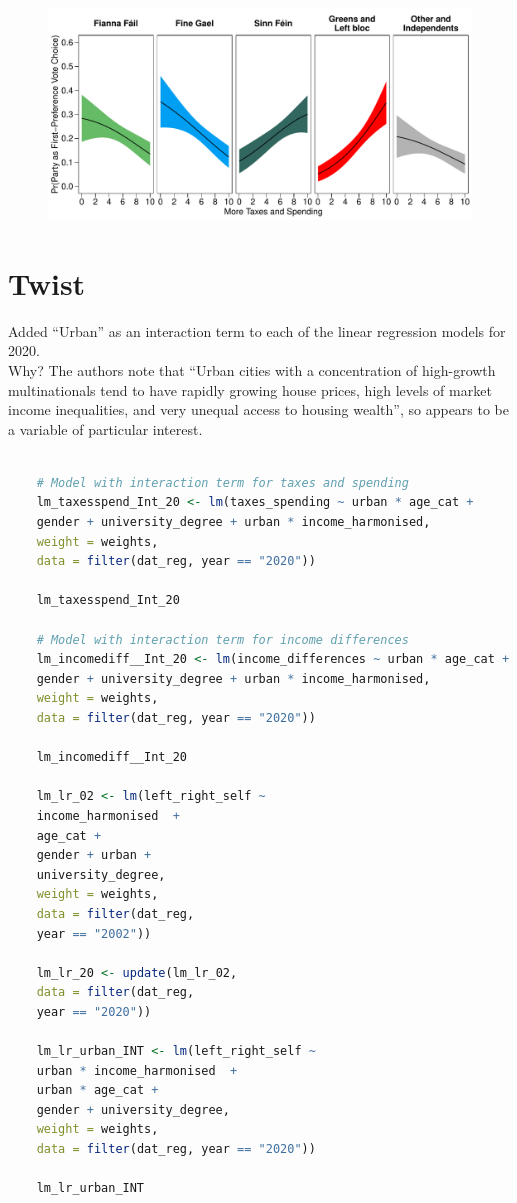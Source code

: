 \documentclass[12pt,letterpaper]{article}
\begin{document}
\begin{figure}
	\centering
\includegraphics[width=0.9\linewidth]{fig_06}
\end{figure}

\newpage
\section*{Twist} 
\vspace{.25cm}

Added “Urban” as an interaction term to each of the linear regression models for 2020.\\

\noindent Why? The authors note that “Urban cities with a concentration of high-growth multinationals tend to have rapidly growing house prices, high levels of market income inequalities, and very unequal access to housing wealth”, so appears to be a variable of particular interest.

\begin{lstlisting}[language=R]
	
	# Model with interaction term for taxes and spending
	lm_taxesspend_Int_20 <- lm(taxes_spending ~ urban * age_cat +
	gender + university_degree + urban * income_harmonised,
	weight = weights,
	data = filter(dat_reg, year == "2020"))
	
	lm_taxesspend_Int_20 
	
	# Model with interaction term for income differences
	lm_incomediff__Int_20 <- lm(income_differences ~ urban * age_cat +
	gender + university_degree + urban * income_harmonised,
	weight = weights,
	data = filter(dat_reg, year == "2020"))
	
	lm_incomediff__Int_20
	
	lm_lr_02 <- lm(left_right_self ~ 
	income_harmonised  +
	age_cat +
	gender + urban +
	university_degree,
	weight = weights,
	data = filter(dat_reg,
	year == "2002"))
	
	lm_lr_20 <- update(lm_lr_02,  
	data = filter(dat_reg,
	year == "2020"))
	
	lm_lr_urban_INT <- lm(left_right_self ~ 
	urban * income_harmonised  +
	urban * age_cat +
	gender + university_degree,
	weight = weights,
	data = filter(dat_reg, year == "2020"))
	
	lm_lr_urban_INT
	
\end{lstlisting}
\end{document}
